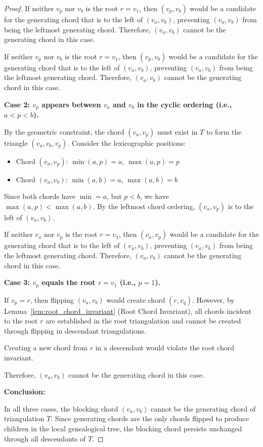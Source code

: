 \documentclass[12pt,a4paper]{article}
\theoremstyle{definition}
\theoremstyle{remark}
\begin{document}
\begin{proof}
If neither $v_p$ nor $v_b$ is the root $r = v_1$, then $(v_p, v_b)$ would be a candidate for the generating chord that is to the left of $(v_a, v_b)$, preventing $(v_a, v_b)$ from being the leftmost generating chord. Therefore, $(v_a, v_b)$ cannot be the generating chord in this case.

If neither $v_p$ nor $v_b$ is the root $r = v_1$, then $(v_p, v_b)$ would be a candidate for the generating chord that is to the left of $(v_a, v_b)$, preventing $(v_a, v_b)$ from being the leftmost generating chord. Therefore, $(v_a, v_b)$ cannot be the generating chord in this case.

\textbf{Case 2: $v_p$ appears between $v_a$ and $v_b$ in the cyclic ordering (i.e., $a < p < b$).}

By the geometric constraint, the chord $(v_a, v_p)$ must exist in $T$ to form the triangle $(v_a, v_b, v_p)$. Consider the lexicographic positions:
\begin{itemize}
    \item Chord $(v_a, v_p)$: $\min(a, p) = a$, $\max(a, p) = p$
    \item Chord $(v_a, v_b)$: $\min(a, b) = a$, $\max(a, b) = b$
\end{itemize}

Since both chords have $\min = a$, but $p < b$, we have $\max(a, p) < \max(a, b)$. By the leftmost chord ordering, $(v_a, v_p)$ is to the left of $(v_a, v_b)$.

If neither $v_a$ nor $v_p$ is the root $r = v_1$, then $(v_a, v_p)$ would be a candidate for the generating chord that is to the left of $(v_a, v_b)$, preventing $(v_a, v_b)$ from being the leftmost generating chord. Therefore, $(v_a, v_b)$ cannot be the generating chord in this case.

\textbf{Case 3: $v_p$ equals the root $r = v_1$ (i.e., $p = 1$).}

If $v_p = r$, then flipping $(v_a, v_b)$ would create chord $(r, v_q)$. However, by Lemma~\ref{lem:root_chord_invariant} (Root Chord Invariant), all chords incident to the root $r$ are established in the root triangulation and cannot be created through flipping in descendant triangulations.

Creating a new chord from $r$ in a descendant would violate the root chord invariant.

Therefore, $(v_a, v_b)$ cannot be the generating chord in this case.

\textbf{Conclusion:}

In all three cases, the blocking chord $(v_a, v_b)$ cannot be the generating chord of triangulation $T$. Since generating chords are the only chords flipped to produce children in the local genealogical tree, the blocking chord persists unchanged through all descendants of $T$.
\end{proof}
\end{document}
